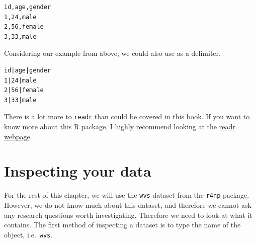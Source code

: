 \documentclass[
]{book}
\begin{document}
\begin{verbatim}
id,age,gender
1,24,male
2,56,female
3,33,male
\end{verbatim}

Considering our example from above, we could also use \texttt{\textbar{}} as a delimiter.

\begin{verbatim}
id|age|gender
1|24|male
2|56|female
3|33|male
\end{verbatim}

There is a lot more to \texttt{readr} than could be covered in this book. If you want to know more about this R package, I highly recommend looking at the \href{https://readr.tidyverse.org}{readr webpage}.

\hypertarget{inspecting-raw-data}{%
\section{Inspecting your data}\label{inspecting-raw-data}}

For the rest of this chapter, we will use the \texttt{wvs} dataset from the \texttt{r4np} package. However, we do not know much about this dataset, and therefore we cannot ask any research questions worth investigating. Therefore we need to look at what it contains. The first method of inspecting a dataset is to type the name of the object, i.e.~\texttt{wvs}.
\end{document}
